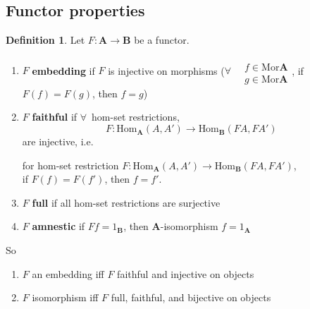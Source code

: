 \documentclass[twoside,landscape,10pt]{amsart}
\theoremstyle{plain}
\theoremstyle{definition}
\newtheorem{definition}{Definition}
\theoremstyle{remark}
\begin{document}
\begin{multicols*}{2}
\begin{itemize}


\end{itemize}

\subsection{Functor properties}

\begin{definition}
  Let $F: \mathbf{A} \to \mathbf{B}$ be a functor.  

\begin{enumerate}
  \item $F$ \textbf{embedding } if $F$ is injective on morphisms ($\forall \, \begin{aligned} & \quad \\
    & f \in \text{Mor}\mathbf{A} \\
    & g \in \text{Mor}\mathbf{A} \end{aligned}$, if $F(f) = F(g)$, then $f=g$) 
\item $F$ \textbf{faithful } if $\forall \,$ hom-set restrictions, 
\[
F: \text{Hom}_{\mathbf{A}}(A,A') \to \text{Hom}_{\mathbf{B}}(FA,FA')
\]
are injective, i.e. 

for hom-set restriction $F: \text{Hom}_{\mathbf{A}}(A,A') \to \text{Hom}_{\mathbf{B}}(FA,FA')$, \\
if $F(f) = F(f')$, then $f=f'$.  

\item $F$ \textbf{full} if all hom-set restrictions are surjective 
\item $F$ \textbf{amnestic} if $Ff=1_{\mathbf{B}}$, then $\mathbf{A}$-isomorphism $f=1_{\mathbf{A}}$
\end{enumerate}
So
\begin{enumerate}
\item $F$ an embedding iff $F$ faithful and injective on objects
\item $F$ isomorphism iff $F$ full, faithful, and bijective on objects
\end{enumerate}


\end{definition}
\end{multicols*}
\end{document}

